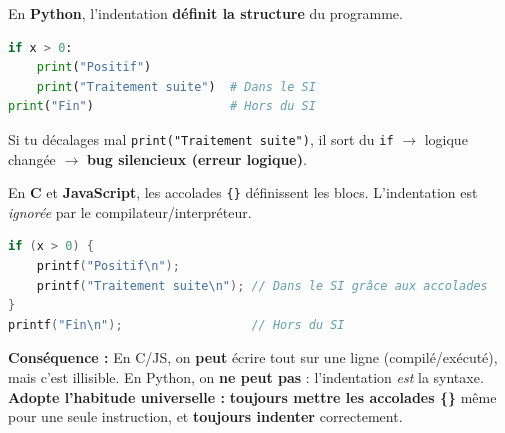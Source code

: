 \documentclass[11pt]{article}
\begin{document}
\begin{attention}
En \textbf{Python}, l'indentation \textbf{définit la structure} du programme.
\begin{lstlisting}[language=Python]
if x > 0:
    print("Positif")
    print("Traitement suite")  # Dans le SI
print("Fin")                   # Hors du SI
\end{lstlisting}
Si tu décalages mal \texttt{print("Traitement suite")}, il sort du \texttt{if} $\to$ logique changée $\to$ \textbf{bug silencieux (erreur logique)}.

En \textbf{C} et \textbf{JavaScript}, les accolades \texttt{\{\}} définissent les blocs. L'indentation est \emph{ignorée} par le compilateur/interpréteur.
\begin{lstlisting}[language=C]
if (x > 0) {
    printf("Positif\n");
    printf("Traitement suite\n"); // Dans le SI grâce aux accolades
}
printf("Fin\n");                  // Hors du SI
\end{lstlisting}
\textbf{Conséquence :} En C/JS, on \textbf{peut} écrire tout sur une ligne (compilé/exécuté), mais c'est illisible. En Python, on \textbf{ne peut pas} : l'indentation \emph{est} la syntaxe. \textbf{Adopte l'habitude universelle :} \textbf{toujours mettre les accolades \{\}} même pour une seule instruction, et \textbf{toujours indenter} correctement.
\end{attention}
\end{document}
